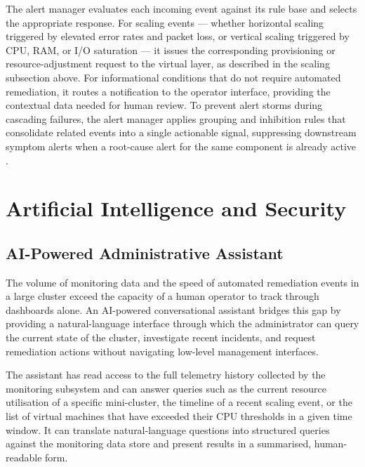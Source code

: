 \documentclass[a4paper, 12pt]{report}
\begin{document}
The alert manager evaluates each incoming event against its rule base
and selects the appropriate response.  For scaling events --- whether
horizontal scaling triggered by elevated error rates and packet loss, or
vertical scaling triggered by CPU, RAM, or I/O saturation --- it issues
the corresponding provisioning or resource-adjustment request to the
virtual layer, as described in the scaling subsection above.  For
informational conditions that do not require automated remediation, it
routes a notification to the operator interface, providing the
contextual data needed for human review.  To prevent alert storms during
cascading failures, the alert manager applies grouping and inhibition
rules that consolidate related events into a single actionable signal,
suppressing downstream symptom alerts when a root-cause alert for the
same component is already active \cite{beyer2016sre}.
 
\section{Artificial Intelligence and Security}
 
\subsection{AI-Powered Administrative Assistant}
 
The volume of monitoring data and the speed of automated remediation
events in a large cluster exceed the capacity of a human operator to
track through dashboards alone.  An AI-powered conversational assistant
bridges this gap by providing a natural-language interface through which
the administrator can query the current state of the cluster, investigate
recent incidents, and request remediation actions without navigating
low-level management interfaces.
 
The assistant has read access to the full telemetry history collected
by the monitoring subsystem and can answer queries such as the current
resource utilisation of a specific mini-cluster, the timeline of a
recent scaling event, or the list of virtual machines that have exceeded
their CPU thresholds in a given time window.  It can translate
natural-language questions into structured queries against the monitoring
data store and present results in a summarised, human-readable form.
 
\end{document}
